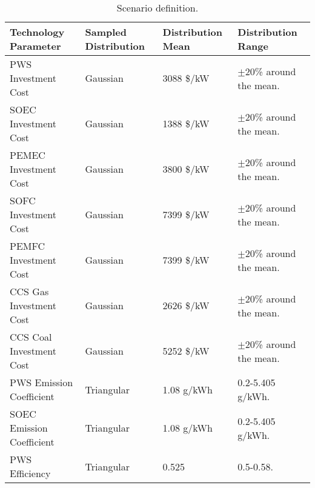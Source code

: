 \begin{table}[!ht]
	\caption{Scenario definition.}
	\vspace{0.1in}
	\begin{tabularx}{\textwidth}{p{} p{} p{}p{}}
\hline 
\textbf{Technology} \textbf{Parameter} & \textbf{Sampled Distribution} & \textbf{Distribution Mean}& \textbf{Distribution Range}\\
\hline
\gls{PWS} Investment Cost       & Gaussian    & 3088 \$/kW & $\pm$20\% around the mean. \\                  
\gls{SOEC} Investment Cost      & Gaussian    & 1388 \$/kW & $\pm$20\% around the mean. \\                  
\gls{PEMEC} Investment Cost     & Gaussian    & 3800 \$/kW & $\pm$20\% around the mean. \\                  
\gls{SOFC} Investment Cost      & Gaussian    & 7399 \$/kW & $\pm$20\% around the mean. \\                  
\gls{PEMFC} Investment Cost     & Gaussian    & 7399 \$/kW & $\pm$20\% around the mean. \\                  
\gls{CCS} Gas Investment Cost   & Gaussian    & 2626 \$/kW & $\pm$20\% around the mean. \\                  
\gls{CCS} Coal Investment Cost  & Gaussian    & 5252 \$/kW & $\pm$20\% around the mean. \\
\gls{PWS} Emission Coefficient  & Triangular  & 1.08 g/kWh & 0.2-5.405 g/kWh. \\                  
\gls{SOEC} Emission Coefficient & Triangular  & 1.08 g/kWh & 0.2-5.405 g/kWh. \\
\gls{PWS} Efficiency            & Triangular  & 0.525 & 0.5-0.58. \\                               
\hline
	\end{tabularx}
\label{sa-vars}
\end{table}